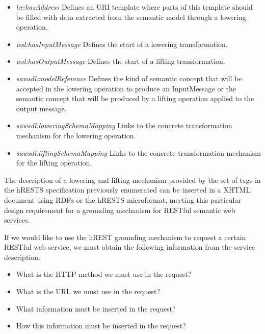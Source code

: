\begin{itemize}
  \item \emph{hr:hasAddress} Defines an URI template where parts of this template should be filled with data extracted from the semantic model through a lowering operation.
  \item \emph{wsl:hasInputMessage} Defines the start of a lowering transformation.
  \item \emph{wsl:hasOutputMessage} Defines the start of a lifting transformation.
  \item \emph{sawsdl:modelReference} Defines the kind of semantic concept that will be accepted in the lowering operation to produce an InputMessage or the semantic concept that will be produced by a lifting operation applied to the output message.
 \item  \emph{sawsdl:loweringSchemaMapping} Links to the concrete transformation mechanism for the lowering operation.
 \item  \emph{sawsdl:liftingSchemaMapping} Links to the concrete transformation mechanism for the lifting operation.
\end{itemize}

The description of a lowering and lifting mechanism provided by the set of tags in the hRESTS specification previously enumerated can be inserted in a XHTML document using RDFa or the hRESTS microformat, meeting this particular design requirement for a grounding mechanism for RESTful semantic web services.

If we would like to use the hREST grounding mechanism to request a certain RESTful web service, we must obtain the following information from the service description.
\begin{itemize}
  \item What is the HTTP method we must use in the request?
  \item What is the URL we must use in the request?
  \item What information must be inserted in the request?
  \item How this information must be inserted in the request?
\end{itemize}

